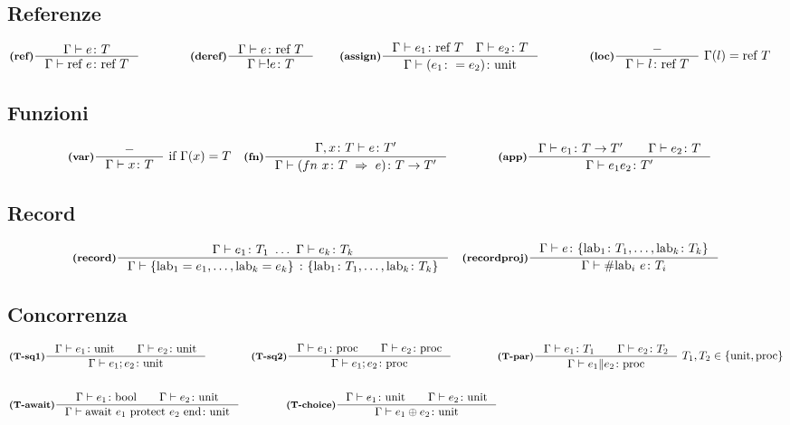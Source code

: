 \documentclass[a4paper, 10pt]{article}
\newcommand{\bool}{\textup{bool}}
\newcommand{\infer}[4]{\inference[\textbf{#1}]{#2}{#3}#4 }
\begin{document}
\begin{minipage}{.45\linewidth}
\begin{flushleft}
\subsection*{Referenze}
	\begin{align*}
		&\infer{(ref)}{\Gamma\vdash e \colon T}{\Gamma\vdash \text{ref } e\colon \text{ref } T}{}  \qquad  \qquad
		\infer{(deref)}{\Gamma\vdash e \colon\text{ref } T}{\Gamma\vdash !e \colon T}{} \qquad
		\infer{(assign)}{\Gamma\vdash e_1\colon \text{ref } T\quad \Gamma\vdash e_2\colon T }{\Gamma\vdash (e_1 \colon = e_2)\colon \text{unit}}{}\qquad  \qquad
		\infer{(loc)}{-}{\Gamma\vdash l\colon \text{ref } T}{\ \Gamma (l) = \text{ref } T}
	\end{align*}
\subsection*{Funzioni}
	\begin{align*}
		&\infer{(var)}{-}{\Gamma \vdash x \colon T}{\ \textup{if}\ \Gamma (x) = T} 
		&\infer{(fn)}{\Gamma , x \colon T \vdash e\colon T'}{\Gamma\vdash (fn\ x\colon T\ \Rightarrow\ e )\colon T\rightarrow T'}{} \qquad\qquad
		&\infer{(app)}{\Gamma \vdash e_1 \colon T \rightarrow T'\qquad \Gamma\vdash e_2\colon T}{\Gamma\vdash e_1 e_2\colon T'}{} 
	\end{align*}
\subsection*{Record}
	\begin{align*}
		&\infer{(record)}{\Gamma \vdash e_1 \colon T_1\ \dots\ \Gamma \vdash e_k \colon T_k}{\Gamma \vdash \{\text{lab}_1 = e_1, \dots, \text{lab}_k = e_k \}\ \colon \{\text{lab}_1 \colon T_1,\dots, \text{lab}_k\colon T_k  \} }{}
		&\infer{(recordproj)}{\Gamma\vdash e\colon \{\text{lab}_1\colon T_1,\dots, \text{lab}_k\colon T_k \} }{\Gamma\vdash \# \text{lab}_i\ e \colon T_i}{}
	\end{align*}
\subsection*{Concorrenza}
	\begin{align*}
		&\infer{(T-sq1)}{\Gamma\vdash e_1\colon\textup{unit}\qquad \Gamma\vdash e_2\colon\textup{unit}}{\Gamma\vdash e_1;e_2\colon \textup{unit}}{}
		&\infer{(T-sq2)}{\Gamma\vdash e_1\colon\textup{proc}\qquad \Gamma\vdash e_2\colon\textup{proc}}{\Gamma\vdash e_1;e_2\colon \textup{proc}}{} \qquad\qquad
		&\infer{(T-par)}{\Gamma\vdash e_1\colon T_1\qquad \Gamma\vdash e_2\colon T_2}{\Gamma\vdash e_1 \| e_2\colon \textup{proc}}{\ T_1, T_2 \in \{\textup{unit}, \textup{proc}\}} \\ \\
		&\infer{(T-await)}{\Gamma\vdash e_1 \colon \bool\qquad \Gamma\vdash e_2\colon \textup{unit}}{
			\Gamma\vdash \textup{await}\ e_1\ \textup{protect}\ e_2\ \textup{end}\colon \textup{unit} }{} 
		&\infer{(T-choice)}{\Gamma\vdash e_1 \colon \textup{unit}\qquad \Gamma\vdash e_2\colon \textup{unit}}{\Gamma\vdash e_1 \oplus e_2\colon \textup{unit}}{}
	\end{align*}
	\end{flushleft}
\end{minipage}
\end{document}
